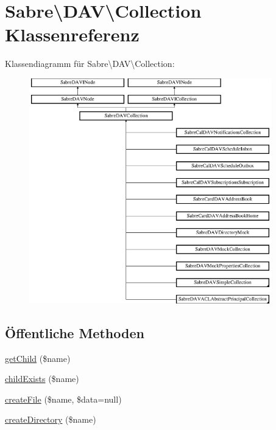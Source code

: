 \hypertarget{class_sabre_1_1_d_a_v_1_1_collection}{}\section{Sabre\textbackslash{}D\+AV\textbackslash{}Collection Klassenreferenz}
\label{class_sabre_1_1_d_a_v_1_1_collection}
Klassendiagramm für Sabre\textbackslash{}D\+AV\textbackslash{}Collection\+:\begin{figure}[H]
\begin{center}
\leavevmode
\includegraphics[height=9.787766cm]{class_sabre_1_1_d_a_v_1_1_collection}
\end{center}
\end{figure}
\subsection*{Öffentliche Methoden}
\begin{DoxyCompactItemize}
\item 
\mbox{\hyperlink{class_sabre_1_1_d_a_v_1_1_collection_ab9ce539f25ea9222f3a3bfd4d9673c02}{get\+Child}} (\$name)
\item 
\mbox{\hyperlink{class_sabre_1_1_d_a_v_1_1_collection_ae51aca8bc4fecd69064bdd0cf2cda6fa}{child\+Exists}} (\$name)
\item 
\mbox{\hyperlink{class_sabre_1_1_d_a_v_1_1_collection_af2ab7895780c34b2e0eb4d7c3972d0f3}{create\+File}} (\$name, \$data=null)
\item 
\mbox{\hyperlink{class_sabre_1_1_d_a_v_1_1_collection_a575855fe925f4aae78a6a5fd829029ff}{create\+Directory}} (\$name)
\end{DoxyCompactItemize}


